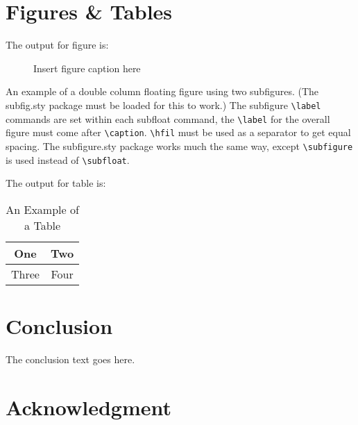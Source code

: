 \documentclass{cta-author}%
\begin{document}
\section{Figures \& Tables}

The output for figure is:

\begin{figure}[!h]
\caption{Insert figure caption here}
\label{fig_sim}
\end{figure}

 An example of a double column floating figure using two subfigures.
 (The subfig.sty package must be loaded for this to work.)
 The subfigure \verb+\label+ commands are set within each subfloat command, the
 \verb+\label+ for the overall figure must come after \verb+\caption+.
 \verb+\hfil+ must be used as a separator to get equal spacing.
 The subfigure.sty package works much the same way, except \verb+\subfigure+ is
 used instead of \verb+\subfloat+.


\vskip2pc

\noindent The output for table is:

\begin{table}[!h]
\caption{An Example of a Table}%
\label{table_example}
\centering
\begin{tabular}{|c||c|}%
\hline
One & Two\\ %
\hline
Three & Four\\%
\hline
\end{tabular}
\end{table}%

\section{Conclusion}
The conclusion text goes here.

\section*{Acknowledgment}
\end{document}
